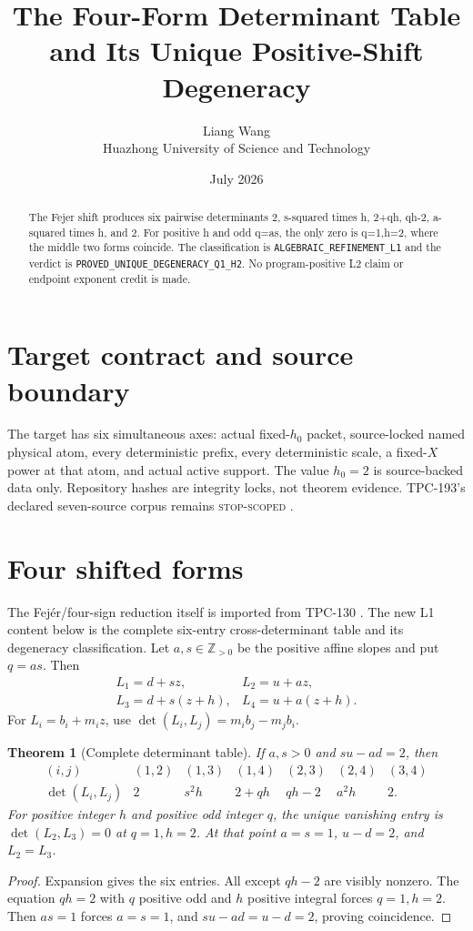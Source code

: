 \documentclass[11pt]{article}
\title{\textbf{The Four-Form Determinant Table and Its Unique Positive-Shift Degeneracy}}
\author{Liang Wang\\Huazhong University of Science and Technology}
\date{July 2026}
\newtheorem{theorem}{Theorem}
\begin{document}
\maketitle
\begin{abstract}
The Fejer shift produces six pairwise determinants 2, s-squared times h, 2+qh, qh-2, a-squared times h, and 2. For positive h and odd q=as, the only zero is q=1,h=2, where the middle two forms coincide.
The classification is \texttt{ALGEBRAIC\_\allowbreak{}REFINEMENT\_\allowbreak{}L1} and the
verdict is \texttt{PROVED\_\allowbreak{}UNIQUE\_\allowbreak{}DEGENERACY\_\allowbreak{}Q1\_\allowbreak{}H2}.  No program-positive L2
claim or endpoint exponent credit is made.
\end{abstract}

\section{Target contract and source boundary}
The target has six simultaneous axes: actual fixed-\(h_0\) packet,
source-locked named physical atom, every deterministic prefix, every
deterministic scale, a fixed-\(X\) power at that atom, and actual active
support.  The value \(h_0=2\) is source-backed data only.  Repository hashes
are integrity locks, not theorem evidence.  TPC-193's declared seven-source
corpus remains \textsc{stop-scoped} \citep{WangTPC193}.


\section{Four shifted forms}
The Fej\'er/four-sign reduction itself is imported from TPC-130
\citep{WangTPC130}.  The new L1 content below is the complete six-entry
cross-determinant table and its degeneracy classification.
Let \(a,s\in\mathbb Z_{>0}\) be the positive affine slopes and put
\(q=as\).  Then
\[
\begin{array}{ll}
 L_1=d+sz,&L_2=u+az,\\
 L_3=d+s(z+h),&L_4=u+a(z+h).
\end{array}
\]
For \(L_i=b_i+m_i z\), use
\(\det(L_i,L_j)=m_i b_j-m_j b_i\).

\begin{theorem}[Complete determinant table]
If \(a,s>0\) and \(su-ad=2\), then
\[
\begin{array}{c|cccccc}
(i,j)&(1,2)&(1,3)&(1,4)&(2,3)&(2,4)&(3,4)\\ \hline
\det(L_i,L_j)&2&s^2h&2+qh&qh-2&a^2h&2.
\end{array}
\]
For positive integer \(h\) and positive odd integer \(q\), the unique
vanishing entry is \(\det(L_2,L_3)=0\) at \(q=1,h=2\).
At that point \(a=s=1\), \(u-d=2\), and \(L_2=L_3\).
\end{theorem}
\begin{proof}
Expansion gives the six entries.  All except \(qh-2\) are visibly nonzero.
The equation \(qh=2\) with \(q\) positive odd and \(h\) positive integral
forces \(q=1,h=2\).  Then \(as=1\) forces \(a=s=1\), and
\(su-ad=u-d=2\), proving coincidence.
\end{proof}
\end{document}
